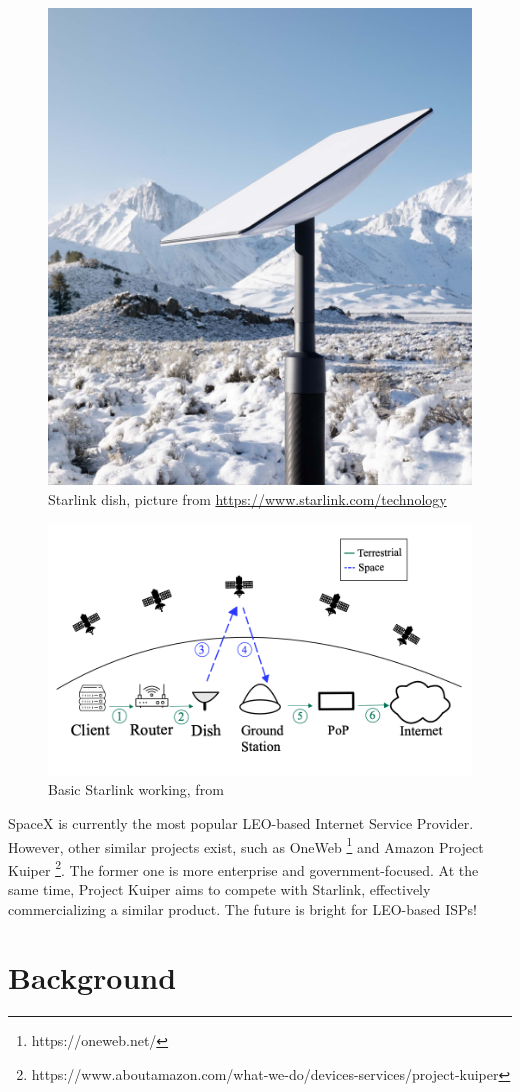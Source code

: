 \documentclass[IN,11pt,twoside,openright,idp,english]{tumthesis}
\begin{document}
\begin{figure}
  \centering
  \includegraphics[width=0.6\columnwidth]{img/dish.jpeg}
  \caption{Starlink dish, picture from  \protect\url{https://www.starlink.com/technology}}
  \label{fig:dish}
\end{figure}

\begin{figure}
  \centering
  \includegraphics[width=0.6\columnwidth]{img/starlink-101.png}
  \caption{Basic Starlink working, from \cite{izhikevich2023democratizing}}
  \label{fig:starlink-101}
\end{figure}

SpaceX is currently the most popular LEO-based Internet Service Provider. However, other similar projects exist, such as OneWeb \footnote{https://oneweb.net/} and Amazon Project Kuiper \footnote{https://www.aboutamazon.com/what-we-do/devices-services/project-kuiper}. The former one is more enterprise and government-focused. At the same time, Project Kuiper aims to compete with Starlink, effectively commercializing a similar product. The future is bright for LEO-based ISPs!

\section{Background}
\end{document}
